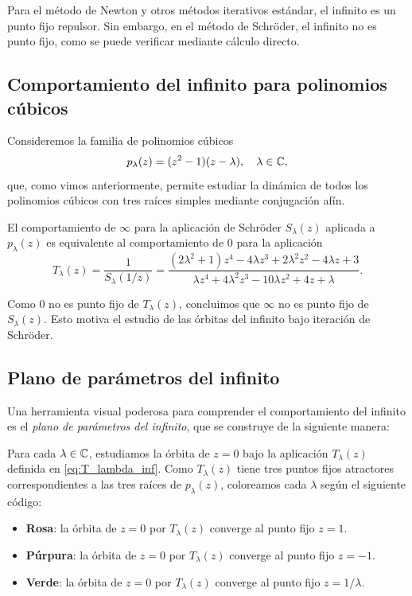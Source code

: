 Para el método de Newton y otros métodos iterativos estándar, el infinito es un punto fijo repulsor. Sin embargo, en el método de Schröder, el infinito no es punto fijo, como se puede verificar mediante cálculo directo.

\subsection{Comportamiento del infinito para polinomios cúbicos}

Consideremos la familia de polinomios cúbicos
\begin{equation}
p_\lambda(z)=(z^2-1)(z-\lambda), \quad \lambda\in\mathbb{C},
\label{eq:familia_cubica_inf}
\end{equation}
que, como vimos anteriormente, permite estudiar la dinámica de todos los polinomios cúbicos con tres raíces simples mediante conjugación afín.

El comportamiento de $\infty$ para la aplicación de Schröder $S_\lambda(z)$ aplicada a $p_\lambda(z)$ es equivalente al comportamiento de $0$ para la aplicación
\begin{equation}
T_\lambda(z)=\frac{1}{S_\lambda(1/z)}=\frac{(2\lambda^2+1)z^4-4\lambda z^3+2\lambda^2 z^2-4\lambda z+3}{\lambda z^4+4\lambda^2 z^3-10\lambda z^2+4z+\lambda}.
\label{eq:T_lambda_inf}
\end{equation}

Como $0$ no es punto fijo de $T_\lambda(z)$, concluimos que $\infty$ no es punto fijo de $S_\lambda(z)$. Esto motiva el estudio de las órbitas del infinito bajo iteración de Schröder.

\subsection{Plano de parámetros del infinito}

Una herramienta visual poderosa para comprender el comportamiento del infinito es el \emph{plano de parámetros del infinito}, que se construye de la siguiente manera:

Para cada $\lambda\in\mathbb{C}$, estudiamos la órbita de $z=0$ bajo la aplicación $T_\lambda(z)$ definida en \eqref{eq:T_lambda_inf}. Como $T_\lambda(z)$ tiene tres puntos fijos atractores correspondientes a las tres raíces de $p_\lambda(z)$, coloreamos cada $\lambda$ según el siguiente código:

\begin{itemize}
\item \textbf{Rosa}: la órbita de $z=0$ por $T_\lambda(z)$ converge al punto fijo $z=1$.
\item \textbf{Púrpura}: la órbita de $z=0$ por $T_\lambda(z)$ converge al punto fijo $z=-1$.
\item \textbf{Verde}: la órbita de $z=0$ por $T_\lambda(z)$ converge al punto fijo $z=1/\lambda$.
\end{itemize}

